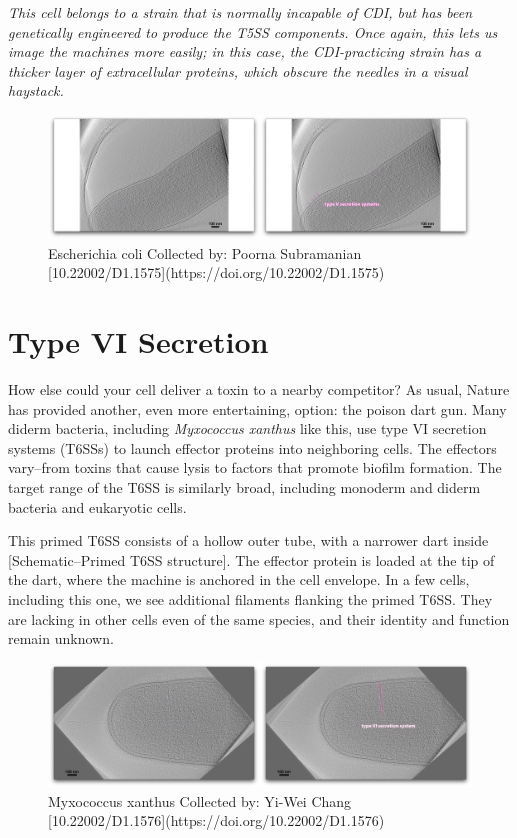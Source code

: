 \documentclass[]{tufte-book}
\begin{document}
\emph{This cell belongs to a strain that is normally incapable of CDI,
but has been genetically engineered to produce the T5SS components. Once
again, this lets us image the machines more easily; in this case, the
CDI-practicing strain has a thicker layer of extracellular proteins,
which obscure the needles in a visual haystack.}

\begin{figure}
\includegraphics{movie_stills/9_5} \caption[Escherichia coli Collected by]{Escherichia coli Collected by: Poorna Subramanian [10.22002/D1.1575](https://doi.org/10.22002/D1.1575)}\label{fig:unnamed-chunk-160}
\end{figure}

\section{Type VI Secretion}\label{type-vi-secretion}

How else could your cell deliver a toxin to a nearby competitor? As
usual, Nature has provided another, even more entertaining, option: the
poison dart gun. Many diderm bacteria, including \emph{Myxococcus
xanthus} like this, use type VI secretion systems (T6SSs) to launch
effector proteins into neighboring cells. The effectors vary--from
toxins that cause lysis to factors that promote biofilm formation. The
target range of the T6SS is similarly broad, including monoderm and
diderm bacteria and eukaryotic cells.

This primed T6SS consists of a hollow outer tube, with a narrower dart
inside {[}Schematic--Primed T6SS structure{]}. The effector protein is
loaded at the tip of the dart, where the machine is anchored in the cell
envelope. In a few cells, including this one, we see additional
filaments flanking the primed T6SS. They are lacking in other cells even
of the same species, and their identity and function remain unknown.

\begin{figure}
\includegraphics{movie_stills/9_6} \caption[Myxococcus xanthus Collected by]{Myxococcus xanthus Collected by: Yi-Wei Chang [10.22002/D1.1576](https://doi.org/10.22002/D1.1576)}\label{fig:unnamed-chunk-161}
\end{figure}
\end{document}
